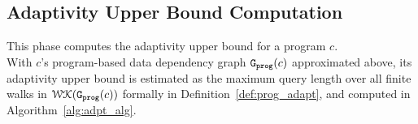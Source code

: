 \subsection{Adaptivity Upper Bound Computation}
\label{sec:alg_adaptcompute}
This phase computes the adaptivity upper bound for a program $c$.
\\
With
$c$'s program-based data dependency graph $\mathtt{{G_{prog}}}({c})$ approximated above,
%
its adaptivity upper bound 
%
is estimated as
the maximum query length over all finite walks in $\mathcal{WK}(\mathtt{{G_{prog}}}({c}))$ formally in Definition~\ref{def:prog_adapt}, 
and computed 
in Algorithm~\ref{alg:adpt_alg}.
%
%

